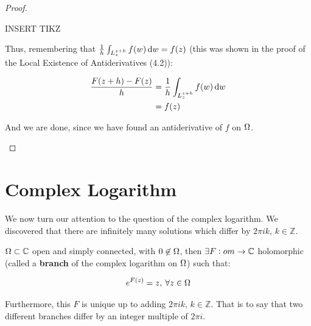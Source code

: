 \begin{proof}
\begin{enumerate}
    INSERT TIKZ
    
    
    
    Thus, remembering that $\frac{1}{h} \int_{L_z^{z+h}} f(w) \dif w = f(z)$ (this was shown in the proof of the Local Existence of Antiderivatives (4.2)):
    
    \begin{align*}
        \frac{F(z+h) - F(z)}{h} &= \frac{1}{h} \int_{L_z^{z+h}} f(w) \dif w\\
        &= f(z)
    \end{align*}
    
    And we are done, since we have found an antiderivative of $f$ on $\Omega$.
    
    
    
    
    
\end{enumerate}    

\end{proof}



\section{Complex Logarithm}

We now turn our attention to the question of the complex logarithm. We discovered that there are infinitely many solutions which differ by $2 \pi i k, \, k \in \mathbb{Z}$.

\begin{theorem}
$\Omega \subset \mathbb{C}$ open and simply connected, with $0 \not\in \Omega$, then $\exists F : 
om \to \mathbb{C}$ holomorphic (called a \textbf{branch} of the complex logarithm on $\Omega$) such that:

\begin{align*}
    e^{F(z)} = z, \: \forall z \in \Omega
\end{align*}

Furthermore, this $F$ is unique up to adding $2 \pi i k, \, k \in \mathbb{Z}$. That is to say that two different branches differ by an integer multiple of $2 \pi i$.
\end{theorem}

